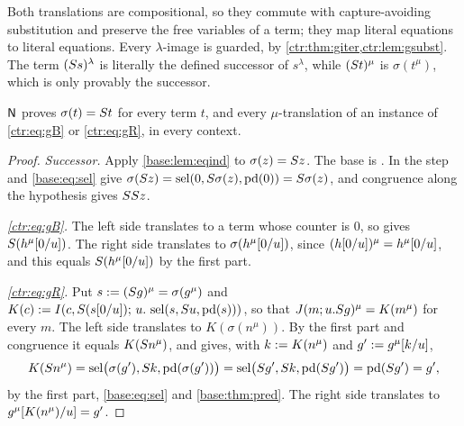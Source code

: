 Both translations are compositional, so they commute with capture-avoiding substitution and
preserve the free variables of a term; they map literal equations to literal equations.
Every $\lambda$-image is guarded, by \cref{ctr:thm:giter,ctr:lem:gsubst}. The term
$(S s)^\lambda$ is literally the defined successor of $s^\lambda$, while $(S t)^\mu$
is $\sigma(t^\mu)$, which is only provably the successor.

\begin{lemma}\label{ctr:lem:gsigma}
$\mathsf{N}$ proves $\sigma(t)=S t$ for every term $t$, and every $\mu$-translation of an
instance of \eqref{ctr:eq:gB} or \eqref{ctr:eq:gR}, in every context.
\end{lemma}
\begin{proof}
\emph{Successor.} Apply \cref{base:lem:eqind} to $\sigma(z)=S z$. The base is
. In the step  and \eqref{base:eq:sel} give
$\sigma(S z)=\operatorname{sel}(0,S\sigma(z),\mathrm{pd}(0))=S\sigma(z)$, and congruence along the
hypothesis gives $SS z$.

\emph{\eqref{ctr:eq:gB}.} The left side translates to a term whose counter is $0$, so
 gives $S(h^\mu[0/u])$. The right side translates to
$\sigma(h^\mu[0/u])$, since $(h[0/u])^\mu=h^\mu[0/u]$, and this equals
$S(h^\mu[0/u])$ by the first part.

\emph{\eqref{ctr:eq:gR}.} Put $s\mathrel{:=}(S g)^\mu=\sigma(g^\mu)$ and
$K(c)\mathrel{:=}I(c,S(s[0/u]);\,u.\,\operatorname{sel}(s,S u,\mathrm{pd}(s)))$, so that
$J(m;u.S g)^\mu=K(m^\mu)$ for every $m$. The left side translates to $K(\sigma(n^\mu))$.
By the first part and congruence it equals $K(S n^\mu)$, and  gives, with
$k\mathrel{:=} K(n^\mu)$ and $g'\mathrel{:=} g^\mu[k/u]$,
\[
 K(S n^\mu)=\operatorname{sel}\bigl(\sigma(g'),S k,\mathrm{pd}(\sigma(g'))\bigr)
 =\operatorname{sel}\bigl(S g',S k,\mathrm{pd}(S g')\bigr)=\mathrm{pd}(S g')=g',
\]
by the first part, \eqref{base:eq:sel} and \cref{base:thm:pred}. The right side translates to
$g^\mu[K(n^\mu)/u]=g'$.
\end{proof}

